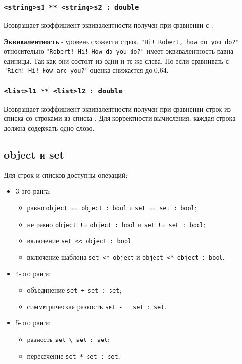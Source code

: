 \documentclass[a4paper, 14pt]{extarticle}
\newenvironment{icItems}
	{ \begin{itemize} [noitemsep,nolistsep] }
	{ \end{itemize} }
\begin{document}
\subsubsection{\lstinline`<string>s1 ** <string>s2 : double`}
Возвращает коэффициент эквивалентности получен при сравнении  с .

{\bf Эквивалентность} - уровень схожести строк. \lstinline`"Hi! Robert, how do you do?"` относительно \lstinline`"Robert! Hi! How do you do?"` имеет эквивалентность равна единицы. Так как они состоят из одни и те же слова. Но если сравнивать с  \lstinline`"Rich! Hi! How are you?"` оценка снижается до 0,64.

\subsubsection{\lstinline`<list>l1 ** <list>l2 : double`}
Возвращает коэффициент эквивалентности получен при сравнении строк из списка  со строками из списка .
Для корректности вычисления, каждая строка должна содержать одно слово.

\subsection{{\color{bluemarin}object} и {\color{bluemarin}set}}

Для строк и списков доступны операций:
\begin{icItems}
	\item
		3-ого ранга:
		\begin{icItems}
		\item
			равно \lstinline`object == object : bool` и \lstinline`set == set : bool`;
		\item
			не равно \lstinline`object != object : bool` и \lstinline`set != set : bool`;
		\item
			включение \lstinline`set << object : bool`;
		\item
			включение шаблона \lstinline`set <* object` и \lstinline`object <* object : bool`.
		\end{icItems}
	\item
		4-ого ранга:
		\begin{icItems}
		\item
			объединение \lstinline`set + set : set`;
		\item
			симметрическая разность \lstinline`set -   set : set`.
		\end{icItems}
	\item
		5-ого ранга:
		\begin{icItems}
		\item
			разность \lstinline`set \ set : set`;
		\item
			пересечение \lstinline`set * set : set`.
		\end{icItems}
\end{icItems}
\end{document}
